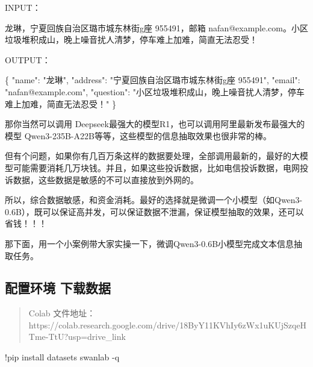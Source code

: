 \documentclass[
]{article}
\newenvironment{Shaded}{}{}
\newcommand{\DataTypeTok}[1]{\textcolor[rgb]{0.56,0.13,0.00}{#1}}
\newcommand{\FunctionTok}[1]{\textcolor[rgb]{0.02,0.16,0.49}{#1}}
\newcommand{\NormalTok}[1]{#1}
\newcommand{\OperatorTok}[1]{\textcolor[rgb]{0.40,0.40,0.40}{#1}}
\newcommand{\StringTok}[1]{\textcolor[rgb]{0.25,0.44,0.63}{#1}}
\begin{document}
INPUT：

\begin{Shaded}
\begin{Highlighting}[]
\NormalTok{龙琳，宁夏回族自治区璐市城东林街g座 955491，邮箱 nafan@example.com。小区垃圾堆积成山，晚上噪音扰人清梦，停车难上加难，简直无法忍受！}
\end{Highlighting}
\end{Shaded}

OUTPUT：

\begin{Shaded}
\begin{Highlighting}[]
\FunctionTok{\{}
    \DataTypeTok{"name"}\FunctionTok{:} \StringTok{"龙琳"}\FunctionTok{,}
    \DataTypeTok{"address"}\FunctionTok{:} \StringTok{"宁夏回族自治区璐市城东林街g座 955491"}\FunctionTok{,}
    \DataTypeTok{"email"}\FunctionTok{:} \StringTok{"nafan@example.com"}\FunctionTok{,}
    \DataTypeTok{"question"}\FunctionTok{:} \StringTok{"小区垃圾堆积成山，晚上噪音扰人清梦，停车难上加难，简直无法忍受！"}
\FunctionTok{\}}
\end{Highlighting}
\end{Shaded}

那你当然可以调用
Deepseek最强大的模型R1，也可以调用阿里最新发布最强大的模型
Qwen3-235B-A22B等等，这些模型的信息抽取效果也很非常的棒。

但有个问题，如果你有几百万条这样的数据要处理，全部调用最新的，最好的大模型可能需要消耗几万块钱。并且，如果这些投诉数据，比如电信投诉数据，电网投诉数据，这些数据是敏感的不可以直接放到外网的。

所以，综合数据敏感，和资金消耗。最好的选择就是微调一个小模型（如Qwen3-0.6B），既可以保证高并发，可以保证数据不泄漏，保证模型抽取的效果，还可以省钱！！！

那下面，用一个小案例带大家实操一下，微调Qwen3-0.6B小模型完成文本信息抽取任务。

\subsection{配置环境
下载数据}\label{ux914dux7f6eux73afux5883-ux4e0bux8f7dux6570ux636e}

\begin{quote}
Colab
文件地址：https://colab.research.google.com/drive/18ByY11KVhIy6zWx1uKUjSzqeHTme-TtU?usp=drive\_link
\end{quote}

\begin{Shaded}
\begin{Highlighting}[]
\OperatorTok{!}\NormalTok{pip install datasets swanlab }\OperatorTok{{-}}\NormalTok{q}
\end{Highlighting}
\end{Shaded}
\end{document}
